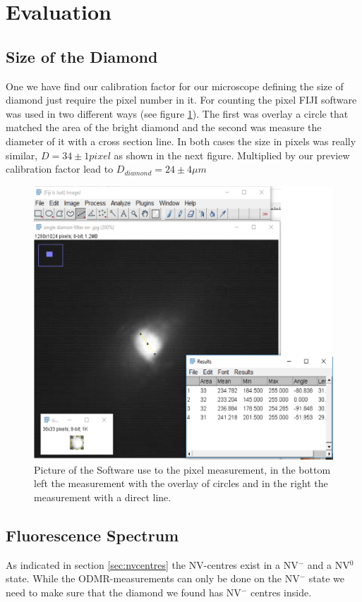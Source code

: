 \section{Evaluation}
\subsection{Size of the Diamond}

One we have find our calibration factor for our microscope defining the size of  diamond just require the pixel number in it. For counting the pixel FIJI software was used in two different ways (see figure \ref{fig:diasize4}). The first was overlay a circle that matched the area of the bright diamond and the second was measure the diameter of it with a cross section line. In both cases the size in pixels was really similar, $D=34\pm1 pixel$ as shown in the next figure. Multiplied by our preview calibration factor lead to $D_{diamond}=24\pm4 \mu m$
\begin{figure}
	\centering
	\includegraphics[width=0.7\linewidth]{../figures/Diasize4}
	\caption[sizediam]{Picture of the Software use to the pixel measurement, in the bottom left the measurement with the overlay of circles and in the right the measurement with a direct line.}
	\label{fig:diasize4}
\end{figure}


\subsection{Fluorescence Spectrum}
As indicated in section \ref{sec:nvcentres} the NV-centres exist in a NV$^-$ and a NV$^0$ state. While the ODMR-measurements can only be done on the NV$^-$ state we need to make sure that the diamond we found has NV$^-$ centres inside.\\

